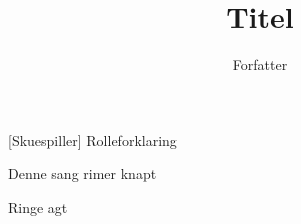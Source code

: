 \documentclass[a4paper,11pt]{article}
\title{Titel}
\author{Forfatter}
\begin{document}
\maketitle

\begin{roles}
[Skuespiller] Rolleforklaring
\end{roles}

\begin{song}
   Denne sang rimer knapt

   Ringe agt

\end{song}
\end{document}
